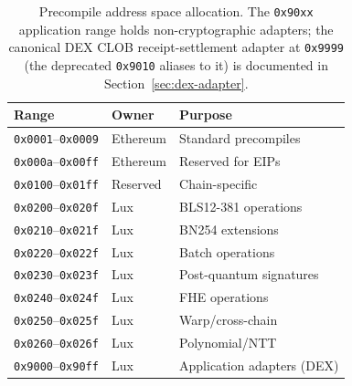 \begin{table}[H]
\centering
\small
\begin{tabular}{@{}lll@{}}
\toprule
\textbf{Range} & \textbf{Owner} & \textbf{Purpose} \\
\midrule
\texttt{0x0001}--\texttt{0x0009} & Ethereum & Standard precompiles \\
\texttt{0x000a}--\texttt{0x00ff} & Ethereum & Reserved for EIPs \\
\texttt{0x0100}--\texttt{0x01ff} & Reserved & Chain-specific \\
\texttt{0x0200}--\texttt{0x020f} & Lux & BLS12-381 operations \\
\texttt{0x0210}--\texttt{0x021f} & Lux & BN254 extensions \\
\texttt{0x0220}--\texttt{0x022f} & Lux & Batch operations \\
\texttt{0x0230}--\texttt{0x023f} & Lux & Post-quantum signatures \\
\texttt{0x0240}--\texttt{0x024f} & Lux & FHE operations \\
\texttt{0x0250}--\texttt{0x025f} & Lux & Warp/cross-chain \\
\texttt{0x0260}--\texttt{0x026f} & Lux & Polynomial/NTT \\
\texttt{0x9000}--\texttt{0x90ff} & Lux & Application adapters (DEX) \\
\bottomrule
\end{tabular}
\caption{Precompile address space allocation. The \texttt{0x90xx}
application range holds non-cryptographic adapters; the canonical DEX CLOB
receipt-settlement adapter at \texttt{0x9999} (the deprecated
\texttt{0x9010} aliases to it) is documented in
Section~\ref{sec:dex-adapter}.}
\end{table}

